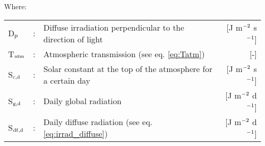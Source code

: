  
Where:\\[5pt]
\begin{tabularx}{\textwidth}{llXr}
D$_{{\rm p}}$ &:& Diffuse irradiation perpendicular to the direction of light  & 
    [J m$^{{\rm -2}}$ s$^{{\rm -1}}$]\\
T$_{{\rm atm}}$ &:& Atmospheric transmission (see eq. \ref{eq:Tatm})  & [-]\\
S$_{{\rm c,d}}$ &:& Solar constant at the top of the atmosphere for a certain day  & 
    [J m$^{{\rm -2}}$ s$^{{\rm -1}}$]\\
S$_{{\rm g,d}}$ &:& Daily global radiation  & [J m$^{{\rm -2}}$ d$^{{\rm -1}}$]\\
S$_{{\rm df,d}}$ &:& Daily diffuse radiation (see eq. \ref{eq:irrad_diffuse})  & 
    [J m$^{{\rm -2}}$ d$^{{\rm -1}}$]\\
\end{tabularx}

